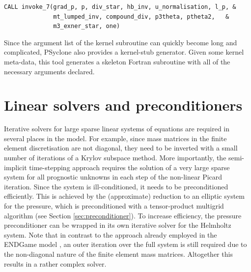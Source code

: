 \documentclass[times]{elsarticle}
\begin{document}
\begin{lstlisting}
CALL invoke_7(grad_p, p, div_star, hb_inv, u_normalisation, l_p, &
              mt_lumped_inv, compound_div, p3theta, ptheta2,   &
              m3_exner_star, one)
\end{lstlisting}

Since the argument list of the kernel subroutine can
quickly become long and complicated, PSyclone also provides a
kernel-stub generator. Given some kernel meta-data, this tool
generates a skeleton Fortran subroutine with all of the necessary
arguments declared.

\section{\label{sec:Solver}Linear solvers and preconditioners}
Iterative solvers for large sparse linear systems of equations are
required in several places in the model. For example, since mass
matrices in the finite element discretisation are not diagonal, they
need to be inverted with a small number of iterations of a Krylov
subspace method. More importantly, the semi-implicit time-stepping
approach requires the solution of a very large sparse system for all
prognostic unknowns in each step of the non-linear Picard
iteration. Since the system is ill-conditioned, it needs to be
preconditioned efficiently. This is achieved by the (approximate)
reduction to an elliptic system for the pressure, which is
preconditioned with a tensor-product multigrid algorithm
\cite{Borm2001} (see Section \ref{sec:preconditioner}). To increase
efficiency, the pressure preconditioner can be wrapped in its own
iterative solver for the Helmholtz system. Note that in contrast to
the approach already employed in the ENDGame model \cite{QJ:QJ2235},
an outer iteration over the full system is still required due to the
non-diagonal nature of the finite element mass matrices. Altogether
this results in a rather complex solver.
\end{document}
